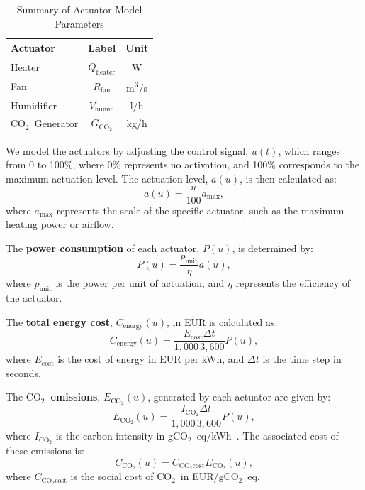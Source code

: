 \documentclass[conference]{IEEEtran}
\newcommand{\coo}{\ensuremath{\mathrm{CO_2}}}
\begin{document}
\begin{table}
    \centering
    \caption{Summary of Actuator Model Parameters}\label{tab:actuators}
    \begin{tabular}{lcc}
        \toprule
        Actuator        & Label                   & Unit                   \\
        \midrule
        Heater          & \( Q_{\text{heater}} \) & W                      \\
        Fan             & \( R_{\text{fan}} \)    & m\textsuperscript{3}/s \\
        Humidifier      & \( V_{\text{humid}} \)  & l/h                    \\
        \coo\ Generator & \( G_{\coo} \)          & kg/h                   \\
        \bottomrule
    \end{tabular}
\end{table}


We model the actuators by adjusting the control signal, \( u(t) \), which ranges from 0 to 100\%, where 0\% represents no activation, and 100\% corresponds to the maximum actuation level. The actuation level, \( a(u) \), is then calculated as:
\begin{equation}
    a(u) = \frac{u}{100}  a_{\text{max}},
\end{equation}
where \( a_{\text{max}} \) represents the scale of the specific actuator, such as the maximum heating power or airflow.

The \textbf{power consumption} of each actuator, \( P(u) \), is determined by:
\begin{equation}
    P(u) = \frac{p_{\text{unit}}}{\eta}  a(u),
\end{equation}
where \( p_{\text{unit}} \) is the power per unit of actuation, and \( \eta \) represents the efficiency of the actuator.

The \textbf{total energy cost}, \( C_{\text{energy}}(u) \), in EUR is calculated as:
\begin{equation}
    C_{\text{energy}}(u) = \frac{E_{\text{cost}}  \Delta t}{1,000 \, 3,600}  P(u),
\end{equation}
where \( E_{\text{cost}} \) is the cost of energy in EUR per kWh, and \( \Delta t \) is the time step in seconds.

The \textbf{\coo\ emissions}, \( E_{\coo}(u) \), generated by each actuator are given by:
\begin{equation}
    E_{\coo}(u) = \frac{I_{\coo}  \Delta t}{1,000  \, 3,600}  P(u),
\end{equation}
where \( I_{\coo} \) is the carbon intensity in g\coo\ eq/kWh~\cite{ElectricityMaps2022}. The associated cost of these emissions is:
\begin{equation}
    C_{\coo}(u) = C_{\coo\text{cost}}  E_{\coo}(u),
\end{equation}
where \( C_{\coo\text{cost}} \) is the social cost of \coo\ in EUR/g\coo\ eq.\\
\end{document}
